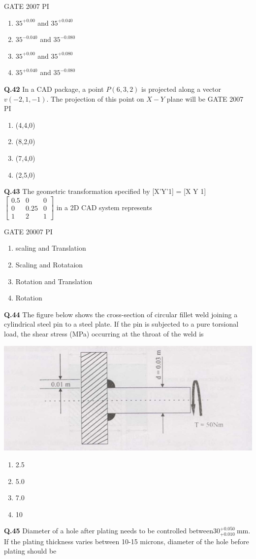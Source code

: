 \documentclass[journal,12pt,onecolumn]{exam}
\theoremstyle{remark}
\begin{document}
\hfill{GATE 2007 PI }
\begin{enumerate}
    \item $35^{+0.00}$ and $35^{+0.040}$
    \item $35^{-0.040}$ and $35^{-0.080}$
    \item $35^{+0.00}$ and $35^{+0.080}$
    \item $35^{+0.040}$ and $35^{-0.080}$
\end{enumerate}
\noindent
\textbf{Q.42}
In a CAD package, a point $P(6, 3, 2)$ is projected along a vector $v(-2,1,-1 )$. The projection of this point on $X-Y$ plane will be
\hfill{GATE 2007 PI}
\begin{enumerate}
    \item (4,4,0)
    \item (8,2,0)
    \item (7,4,0)
    \item (2,5,0)
\end{enumerate}
\noindent
\textbf{Q.43}
The geometric transformation specified by [X'Y'1] = [X Y 1]
 $\begin{bmatrix}
0.5 & 0 & 0 \\
0 & 0.25 & 0 \\
1 & 2 & 1
\end{bmatrix}$ in a 2D CAD system represents

\hfill{GATE 20007 PI}
\begin{enumerate}
    \item scaling and Translation
    \item Scaling and Rotataion
    \item Rotation and Translation
    \item Rotation
\end{enumerate}
\noindent
\textbf{Q.44}    
The figure below shows the cross-section of circular fillet weld joining a cylindrical steel pin to a steel plate. If the pin is subjected to a pure torsional load, the shear stress (MPa) occurring at the throat of the weld is


    \includegraphics[width=0.5\linewidth]{figs/Q.44.png}
    
\begin{enumerate}
    \item 2.5
    \item 5.0
    \item 7.0
    \item 10
\end{enumerate}
\noindent
\textbf{Q.45}
 Diameter of a hole after plating needs to be controlled between$30^{+0.050}_{+0.010} \ \text{mm.}$ If the plating thickness varies between 10-15 microns, diameter of the hole before plating should be
\end{document}

